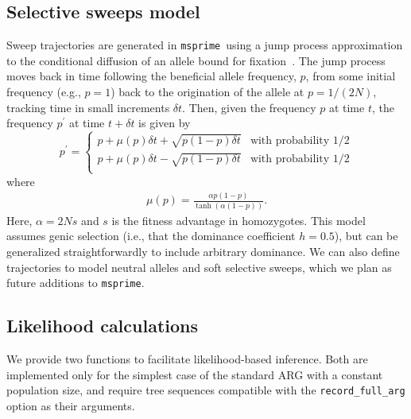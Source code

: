\documentclass[9pt,twocolumn,twoside,lineno]{gsajnl}
\newcommand{\msprime}[0]{\texttt{msprime}}
\begin{document}
\subsection*{Selective sweeps model}
\label{app-sweeps}
Sweep trajectories are generated in \msprime\ using a
jump process approximation to the conditional
diffusion of an allele bound for
fixation~\citep{coop2004ancestral}.
The jump process moves back in time following the beneficial
allele frequency, $p$, from some initial frequency (e.g., $p=1$) back to
the origination of the allele at $p=1/(2N)$, tracking time in small
increments $\delta t$. Then, given the frequency $p$ at time $t$,
the frequency $p^\prime$ at time $t + \delta t$ is given by
\begin{equation*}
p^\prime =
\begin{cases}
    p + \mu(p)\delta t +\sqrt{p(1-p)\delta t} & \mbox{with probability $1/2$}\\
    p + \mu(p)\delta t -\sqrt{p(1-p)\delta t} & \mbox{with probability $1/2$}\\
\end{cases}
\end{equation*}
where
\begin{eqnarray*}
	\mu(p)=\frac{\alpha p (1 - p)}{\tanh(\alpha(1-p))}.
\end{eqnarray*}
Here, $\alpha=2Ns$ and $s$ is the fitness advantage in homozygotes. This model
assumes genic selection (i.e., that the dominance coefficient $h=0.5$), but
can be generalized straightforwardly to include arbitrary dominance.
We can also define trajectories to model neutral alleles and soft
selective sweeps, which we plan as future additions to \msprime.

\subsection*{Likelihood calculations}
\label{app-likelihoods}

We provide two functions to facilitate likelihood-based inference.
Both are implemented only for the simplest case of the standard ARG with a
constant population size, and require tree sequences compatible with the
\texttt{record\_full\_arg} option as their arguments.
\end{document}
